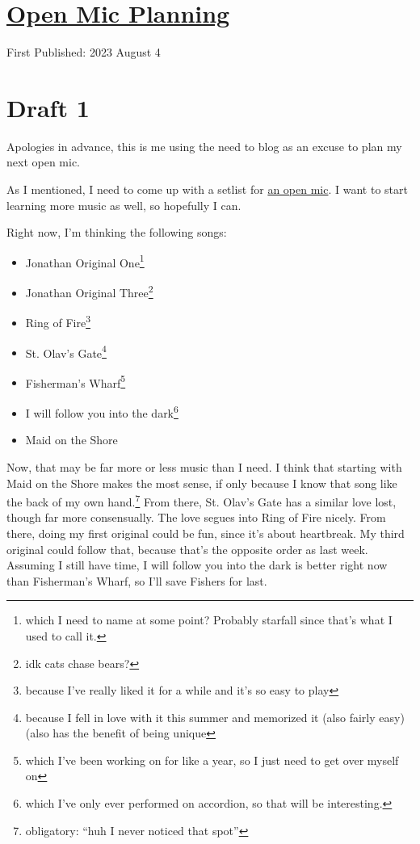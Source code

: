 \documentclass[12pt]{article}[titlepage]
\newcommand{\say}[1]{``#1''}
\newcommand{\1}{\={a}}
\newcommand{\2}{\={e}}
\newcommand{\3}{\={\i}}
\newcommand{\4}{\=o}
\newcommand{\5}{\=u}
\newcommand{\6}{\={A}}
\renewcommand{\,}{\textsuperscript{,}}
\begin{document}
\doublespacing
\section{\href{open-mic-planning.html}{Open Mic Planning}}
First Published: 2023 August 4

\section{Draft 1}
Apologies in advance, this is me using the need to blog as an excuse to plan my next open mic.

As I mentioned, I need to come up with a setlist for \href{open-mic-7}{an open mic}.
I want to start learning more music as well, so hopefully I can.

Right now, I'm thinking the following songs:

\begin{itemize}
\item Jonathan Original One\footnote{which I need to name at some point? Probably starfall since that's what I used to call it.}
\item Jonathan Original Three\footnote{idk cats chase bears?}
\item Ring of Fire\footnote{because I've really liked it for a while and it's so easy to play}
\item St. Olav's Gate\footnote{because I fell in love with it this summer and memorized it (also fairly easy) (also has the benefit of being unique}
\item Fisherman's Wharf\footnote{which I've been working on for like a year, so I just need to get over myself on}
\item I will follow you into the dark\footnote{which I've only ever performed on accordion, so that will be interesting.}
\item Maid on the Shore
\end{itemize}

Now, that may be far more or less music than I need.
I think that starting with Maid on the Shore makes the most sense, if only because I know that song like the back of my own hand.\footnote{obligatory: \say{huh I never noticed that spot}}
From there, St. Olav's Gate has a similar love lost, though far more consensually.
The love segues into Ring of Fire nicely.
From there, doing my first original could be fun, since it's about heartbreak.
My third original could follow that, because that's the opposite order as last week.
Assuming I still have time, I will follow you into the dark is better right now than Fisherman's Wharf, so I'll save Fishers for last.
\end{document}
